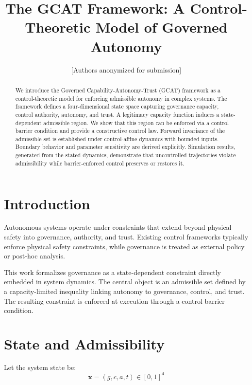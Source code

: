 \documentclass[letterpaper, 10 pt, conference]{ieeeconf}
\title{\bf The GCAT Framework: A Control-Theoretic Model of Governed Autonomy}
\author{[Authors anonymized for submission]}
\begin{document}
\maketitle
\thispagestyle{empty}
\pagestyle{empty}

\begin{abstract}
We introduce the Governed Capability-Autonomy-Trust (GCAT) framework as a control-theoretic model for enforcing admissible autonomy in complex systems. The framework defines a four-dimensional state space capturing governance capacity, control authority, autonomy, and trust. A legitimacy capacity function induces a state-dependent admissible region. We show that this region can be enforced via a control barrier condition and provide a constructive control law. Forward invariance of the admissible set is established under control-affine dynamics with bounded inputs. Boundary behavior and parameter sensitivity are derived explicitly. Simulation results, generated from the stated dynamics, demonstrate that uncontrolled trajectories violate admissibility while barrier-enforced control preserves or restores it.
\end{abstract}

\section{Introduction}

Autonomous systems operate under constraints that extend beyond physical safety into governance, authority, and trust. Existing control frameworks typically enforce physical safety constraints, while governance is treated as external policy or post-hoc analysis.

This work formalizes governance as a state-dependent constraint directly embedded in system dynamics. The central object is an admissible set defined by a capacity-limited inequality linking autonomy to governance, control, and trust. The resulting constraint is enforced at execution through a control barrier condition.

\section{State and Admissibility}

Let the system state be:
\begin{equation}
\mathbf{x} = (g, c, a, t) \in [0,1]^4
\end{equation}
\end{document}
